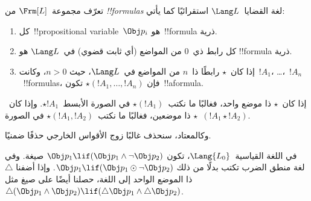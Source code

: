 \documentclass[../../../include/open-logic-section]{subfiles}
\begin{document}


\begin{defn}[الصيغة]
تعرّف مجموعة~$\Frm[L]$ من \emph{!!{formula}s} لغة القضايا~$\Lang L$
استقرائيًا كما يأتي:
\begin{enumerate}
\item كل~!!{propositional variable}~$\Obj p_i$ هو~!!{formula} ذرية.
\item كل رابط ذي~$0$ من المواضع (أي ثابت قضوي) في~$\Lang L$ هو
!!{formula} ذرية.
\item إذا كان~$\star$ رابطًا ذا~$n$ من المواضع في~$\Lang L$، حيث
$n>0$، وكانت~$!A_1$، \dots،~$!A_n$~!!{formula}s، فإن
$\star(!A_1, \dots, !A_n)$ تكون~!!a{formula}.
\end{enumerate}
إذا كان~$\star$ ذا موضع واحد، فغالبًا ما نكتب~$\star(!A_1)$ في
الصورة الأبسط~$\star !A_1$. وإذا كان~$\star$ ذا موضعين، فغالبًا ما
نكتب~$\star(!A_1,!A_2)$ في الصورة~$(!A_1 \star !A_2)$.
\end{defn}

وكالمعتاد، سنحذف غالبًا زوج الأقواس الخارجي حذفًا ضمنيًا.

\begin{ex}
  في اللغة القياسية~$\Lang{L_0}$، تكون
  $\Obj p_1 \lif (\Obj p_1 \land \lnot \Obj p_2)$ صيغة. وفي لغة
  منطق الضرب تكتب بدلًا من ذلك
  $\Obj p_1 \lif (\Obj p_1 \odot \lnot \Obj p_2)$. وإذا أضفنا
  $\triangle$ ذا الموضع الواحد إلى اللغة، حصلنا أيضًا على صيغ مثل
  $\triangle (\Obj p_1 \land \Obj p_2) \lif
  (\triangle \Obj p_1 \land \triangle \Obj p_2)$.
\end{ex}
\end{document}
